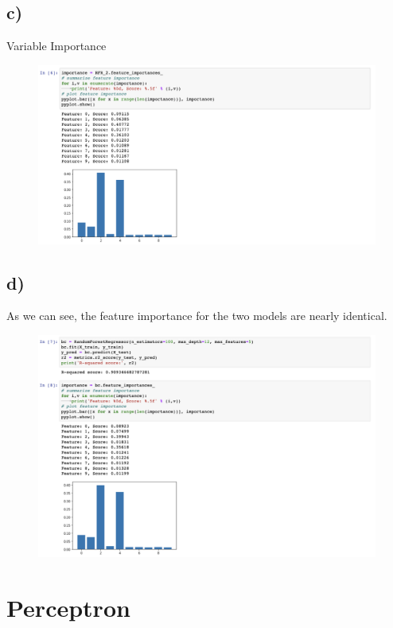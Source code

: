 \documentclass[12pt, letterpaper]{article}
\begin{document}
\subsection*{c)} Variable Importance
\begin{figure}[h!]
  \includegraphics[scale=0.5]{./images/4c}
\end{figure}
\clearpage

\subsection*{d)} As we can see, the feature importance for the two models are nearly identical.
\begin{figure}[h!]
  \includegraphics[scale=0.4]{./images/4d}
\end{figure}
\clearpage

\newpage
\section{Perceptron}
\end{document}
